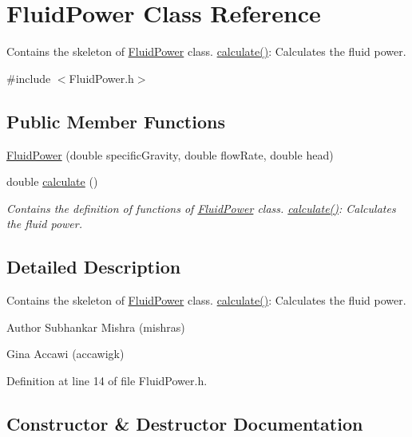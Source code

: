 \hypertarget{class_fluid_power}{}\section{Fluid\+Power Class Reference}
\label{class_fluid_power}


Contains the skeleton of \hyperlink{class_fluid_power}{Fluid\+Power} class. \hyperlink{class_fluid_power_a2691f6efdbd5e71aa91e087c6b1c197b}{calculate()}\+: Calculates the fluid power.  




{\ttfamily \#include $<$Fluid\+Power.\+h$>$}

\subsection*{Public Member Functions}
\begin{DoxyCompactItemize}
\item 
\hyperlink{class_fluid_power_a9bf61af202e27b9e41ed284b4b1643ee}{Fluid\+Power} (double specific\+Gravity, double flow\+Rate, double head)
\item 
double \hyperlink{class_fluid_power_a2691f6efdbd5e71aa91e087c6b1c197b}{calculate} ()
\begin{DoxyCompactList}\small\item\em Contains the definition of functions of \hyperlink{class_fluid_power}{Fluid\+Power} class. \hyperlink{class_fluid_power_a2691f6efdbd5e71aa91e087c6b1c197b}{calculate()}\+: Calculates the fluid power. \end{DoxyCompactList}\end{DoxyCompactItemize}


\subsection{Detailed Description}
Contains the skeleton of \hyperlink{class_fluid_power}{Fluid\+Power} class. \hyperlink{class_fluid_power_a2691f6efdbd5e71aa91e087c6b1c197b}{calculate()}\+: Calculates the fluid power. 

\begin{DoxyAuthor}{Author}
Subhankar Mishra (mishras) 

Gina Accawi (accawigk) 
\end{DoxyAuthor}


Definition at line 14 of file Fluid\+Power.\+h.



\subsection{Constructor \& Destructor Documentation}
\mbox{\label{class_fluid_power_a9bf61af202e27b9e41ed284b4b1643ee}} 
